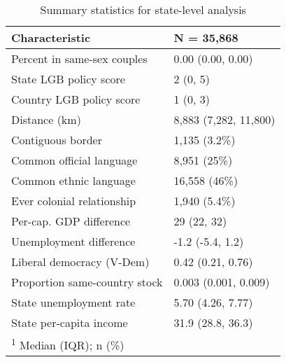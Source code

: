 \documentclass[
  11pt,
]{article}
\begin{document}
\begin{table}[!h]

\caption{\label{tab:desc-table-state}Summary statistics for state-level analysis}
\centering
\fontsize{8}{10}\selectfont
\begin{tabular}[t]{ll}
\toprule
Characteristic & N = 35,868\\
\midrule
Percent in same-sex couples & 0.00 (0.00, 0.00)\\
State LGB policy score & 2 (0, 5)\\
Country LGB policy score & 1 (0, 3)\\
Distance (km) & 8,883 (7,282, 11,800)\\
Contiguous border & 1,135 (3.2\%)\\
\addlinespace
Common official language & 8,951 (25\%)\\
Common ethnic language & 16,558 (46\%)\\
Ever colonial relationship & 1,940 (5.4\%)\\
Per-cap. GDP difference & 29 (22, 32)\\
Unemployment difference & -1.2 (-5.4, 1.2)\\
\addlinespace
Liberal democracy (V-Dem) & 0.42 (0.21, 0.76)\\
Proportion same-country stock & 0.003 (0.001, 0.009)\\
State unemployment rate & 5.70 (4.26, 7.77)\\
State per-capita income & 31.9 (28.8, 36.3)\\
\bottomrule
\multicolumn{2}{l}{\rule{0pt}{1em}\textsuperscript{1} Median (IQR); n (\%)}\\
\end{tabular}
\end{table}
\end{document}
